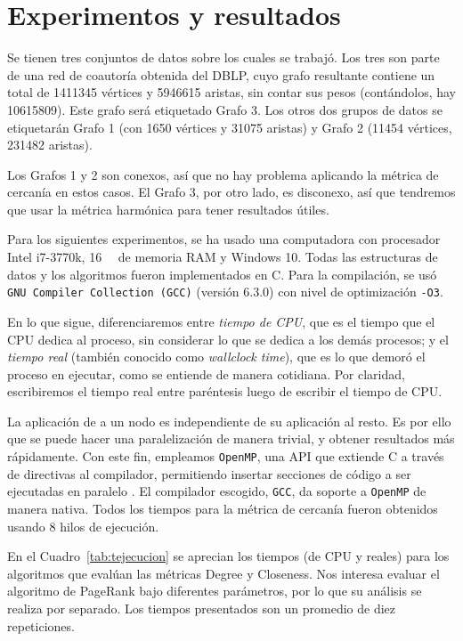 \documentclass[journal]{IEEEtran}
\newcommand{\pkg}[1]{\texttt{#1}}
\begin{document}
\section{Experimentos y resultados}
Se tienen tres conjuntos de datos sobre los cuales se trabajó. Los tres son parte de una red de coautoría obtenida del DBLP, cuyo grafo resultante contiene un total de \num{1411345} vértices y \num{5946615} aristas, sin contar sus pesos (contándolos, hay \num{10615809}). Este grafo será etiquetado Grafo 3. Los otros dos grupos de datos se etiquetarán Grafo 1 (con \num{1650} vértices y \num{31075} aristas) y Grafo 2 (\num{11454} vértices, \num{231482} aristas).

Los Grafos 1 y 2 son conexos, así que no hay problema aplicando la métrica de cercanía en estos casos. El Grafo 3, por otro lado, es disconexo, así que tendremos que usar la métrica harmónica para tener resultados útiles.

Para los siguientes experimentos, se ha usado una computadora con procesador Intel i7-3770k, \SI{16}{\giga\byte} de memoria RAM y Windows 10. Todas las estructuras de datos y los algoritmos fueron implementados en C. Para la compilación, se usó \pkg{GNU Compiler Collection (GCC)} (versión 6.3.0) con nivel de optimización \texttt{-O3}.

En lo que sigue, diferenciaremos entre \textit{tiempo de CPU}, que es el tiempo que el CPU dedica al proceso, sin considerar lo que se dedica a los demás procesos; y el \textit{tiempo real} (también conocido como \textit{wallclock time}), que es lo que demoró el proceso en ejecutar, como se entiende de manera cotidiana. Por claridad, escribiremos el tiempo real entre paréntesis luego de escribir el tiempo de CPU.

La aplicación de  a un nodo es independiente de su aplicación al resto. Es por ello que se puede hacer una paralelización de manera trivial, y obtener resultados más rápidamente. Con este fin, empleamos \pkg{OpenMP}, una API que extiende C a través de directivas al compilador, permitiendo insertar secciones de código a ser ejecutadas en paralelo \cite{openmp}. El compilador escogido, \pkg{GCC}, da soporte a \pkg{OpenMP} de manera nativa. Todos los tiempos para la métrica de cercanía fueron obtenidos usando 8 hilos de ejecución.

En el Cuadro~\ref{tab:tejecucion} se aprecian los tiempos (de CPU y reales) para los algoritmos que evalúan las métricas Degree y Closeness. Nos interesa evaluar el algoritmo de PageRank bajo diferentes parámetros, por lo que su análisis se realiza por separado. Los tiempos presentados son un promedio de diez repeticiones.
\end{document}
